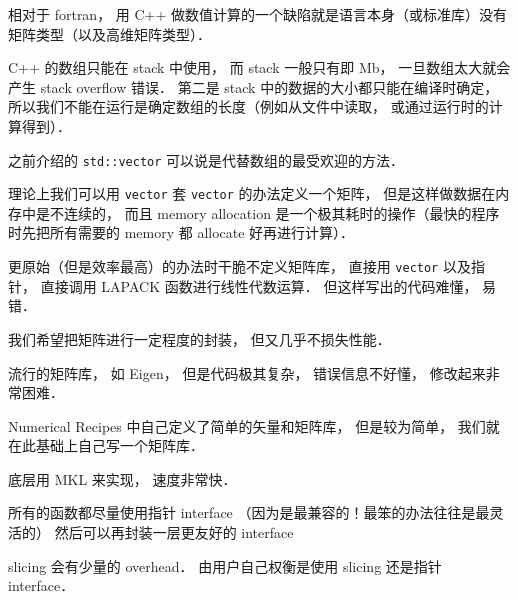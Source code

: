 
相对于 fortran， 用 C++ 做数值计算的一个缺陷就是语言本身（或标准库）没有矩阵类型（以及高维矩阵类型）．

C++ 的数组只能在 stack 中使用， 而 stack 一般只有即 Mb， 一旦数组太大就会产生 stack overflow 错误． 第二是 stack 中的数据的大小都只能在编译时确定， 所以我们不能在运行是确定数组的长度（例如从文件中读取， 或通过运行时的计算得到）．

之前介绍的 \lstinline|std::vector| 可以说是代替数组的最受欢迎的方法．

理论上我们可以用 \lstinline|vector| 套 \lstinline|vector| 的办法定义一个矩阵， 但是这样做数据在内存中是不连续的， 而且 memory allocation 是一个极其耗时的操作（最快的程序时先把所有需要的 memory 都 allocate 好再进行计算）．

更原始（但是效率最高）的办法时干脆不定义矩阵库， 直接用 \lstinline|vector| 以及指针， 直接调用 LAPACK 函数进行线性代数运算． 但这样写出的代码难懂， 易错．

我们希望把矩阵进行一定程度的封装， 但又几乎不损失性能．

流行的矩阵库， 如 Eigen， 但是代码极其复杂， 错误信息不好懂， 修改起来非常困难．

Numerical Recipes 中自己定义了简单的矢量和矩阵库， 但是较为简单， 我们就在此基础上自己写一个矩阵库．

底层用 MKL 来实现， 速度非常快．

所有的函数都尽量使用指针 interface （因为是最兼容的！最笨的办法往往是最灵活的） 然后可以再封装一层更友好的 interface

slicing 会有少量的 overhead． 由用户自己权衡是使用 slicing 还是指针 interface．

